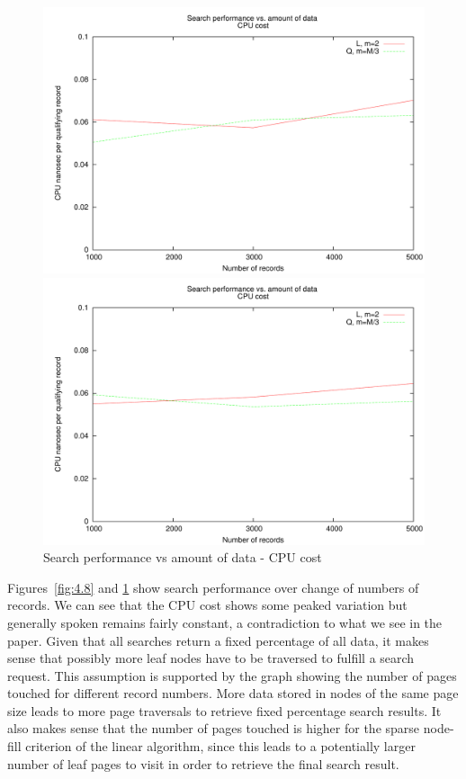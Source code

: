 \begin{figure}
\centering
\begin{minipage}{0.49\textwidth}
\centering
\includegraphics[width=\textwidth]{fig/random/figure-4-9.pdf}
\end{minipage}
\begin{minipage}{0.49\textwidth}
\centering
\includegraphics[width=\textwidth]{fig/usppp/figure-4-9.pdf}
\end{minipage}
\caption{Search performance vs amount of data - CPU cost}
\label{fig:4.9}
\end{figure}

Figures~\ref{fig:4.8} and \ref{fig:4.9} show search performance over change of numbers of records. We can see that the CPU cost shows some peaked variation but generally spoken remains fairly constant, a contradiction to what we see in the paper. Given that all searches return a fixed percentage of all data, it makes sense that possibly more leaf nodes have to be traversed to fulfill a search request. This assumption is supported by the graph showing the number of pages touched for different record numbers. More data stored in nodes of the same page size leads to more page traversals to retrieve fixed percentage search results. It also makes sense that the number of pages touched is higher for the sparse node-fill criterion of the linear algorithm, since this leads to a potentially larger number of leaf pages to visit in order to retrieve the final search result.

